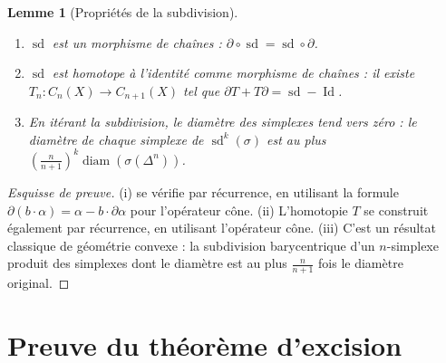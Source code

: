 \documentclass[12pt,a4paper,openany]{book}
\theoremstyle{definition}
\theoremstyle{plain}
\newtheorem{lemme}[definition]{Lemme}
\theoremstyle{remark}
\DeclareMathOperator{\Id}{Id}
\begin{document}
\begin{lemme}[Propriétés de la subdivision]\label{lem:proprietes-subdivision}
\begin{enumerate}[label=(\roman*)]
  \item $\operatorname{sd}$ est un morphisme de chaînes : $\partial \circ \operatorname{sd} = \operatorname{sd} \circ \partial$.
  \item $\operatorname{sd}$ est homotope à l'identité comme morphisme de chaînes : il existe
  $T_n \colon C_n(X) \to C_{n+1}(X)$ tel que $\partial T + T \partial = \operatorname{sd} - \Id$.
  \item En itérant la subdivision, le diamètre des simplexes tend vers zéro :
  le diamètre de chaque simplexe de $\operatorname{sd}^k(\sigma)$ est au plus
  $\left(\frac{n}{n+1}\right)^k \operatorname{diam}(\sigma(\Delta^n))$.
\end{enumerate}
\end{lemme}

\begin{proof}[Esquisse de preuve]
(i) se vérifie par récurrence, en utilisant la formule $\partial(b \cdot \alpha) = \alpha - b \cdot \partial\alpha$
pour l'opérateur cône.
(ii) L'homotopie $T$ se construit également par récurrence, en utilisant l'opérateur cône.
(iii) C'est un résultat classique de géométrie convexe : la subdivision barycentrique d'un
$n$-simplexe produit des simplexes dont le diamètre est au plus $\frac{n}{n+1}$ fois le diamètre original.
\end{proof}

\section{Preuve du théorème d'excision}\label{sec:preuve-excision}
\end{document}
